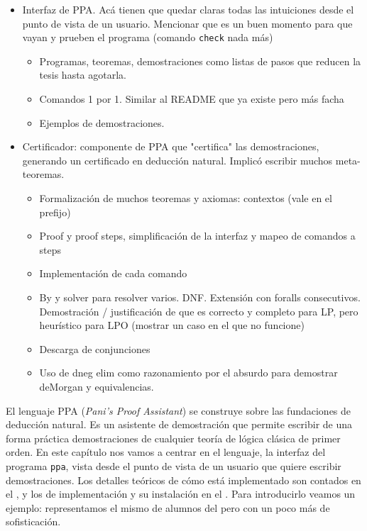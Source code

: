 \begin{itemize}
    \item Interfaz de PPA. Acá tienen que quedar claras todas las intuiciones
    desde el punto de vista de un usuario. Mencionar que es un buen momento para
    que vayan y prueben el programa (comando \texttt{check} nada más) \ok
    \begin{itemize}
        \item Programas, teoremas, demostraciones como listas de pasos que
        reducen la tesis hasta agotarla. \ok
        \item Comandos 1 por 1. Similar al README que ya existe pero más facha \ok
        \item Ejemplos de demostraciones. \ok
    \end{itemize}
    \item Certificador: componente de PPA que "certifica" las demostraciones,
    generando un certificado en deducción natural. Implicó escribir muchos
    meta-teoremas.
    \begin{itemize}
        \item Formalización de muchos teoremas y axiomas: contextos (vale en el prefijo)
        \item Proof y proof steps, simplificación de la interfaz y mapeo de
        comandos a steps
        \item Implementación de cada comando
        \item By y solver para resolver varios. DNF. Extensión con foralls
        consecutivos. Demostración / justificación de que es correcto y completo
        para LP, pero heurístico para LPO (mostrar un caso en el que no funcione)
        \item Descarga de conjunciones
        \item Uso de dneg elim como razonamiento por el absurdo para demostrar
        deMorgan y equivalencias.
    \end{itemize}
\end{itemize}

El lenguaje PPA (\textit{Pani's Proof Assistant}) se construye sobre las
fundaciones de deducción natural. Es un asistente de demostración que permite
escribir de una forma práctica demostraciones de cualquier teoría de lógica
clásica de primer orden. En este capítulo nos vamos a centrar en el lenguaje, la
interfaz del programa \texttt{ppa}, vista desde el punto de vista de un usuario
que quiere escribir demostraciones. Los detalles teóricos de cómo está
implementado son contados en el , y los de
implementación y su instalación en el . Para
introducirlo veamos un ejemplo: representamos el mismo de alumnos del
 pero con un poco más de sofisticación.


